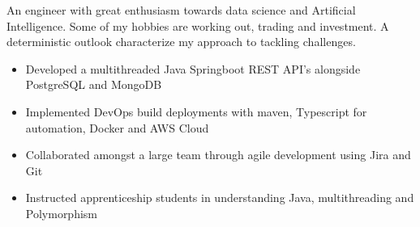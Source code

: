\documentclass[11pt,a4paper,ragged2e]{altacv}
\begin{document}
\begin{paracol}{1}
\smallskip
{}

An engineer with great enthusiasm towards data science and Artificial Intelligence. Some of my hobbies are working out, trading and investment. A deterministic outlook characterize my approach to tackling challenges.\smallskip



\begin{itemize}
\item Developed a multithreaded Java Springboot REST API's alongside PostgreSQL and MongoDB
\item Implemented DevOps build deployments with maven, Typescript for automation, Docker and AWS Cloud
\item Collaborated amongst a large team through agile development using Jira and Git
\item Instructed apprenticeship students in understanding Java, multithreading and Polymorphism 
\end{itemize}
\tightdivider



\end{paracol}
\end{document}
